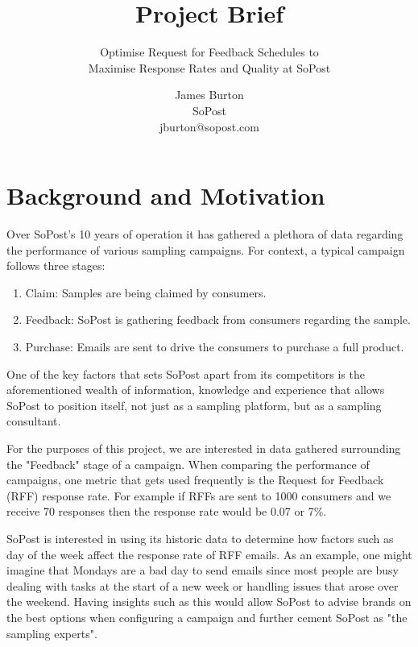 \documentclass[12pt]{scrartcl}
\begin{document}
\title{Project Brief}
\subtitle{Optimise Request for Feedback Schedules to\\
Maximise Response Rates and Quality at SoPost}
\author{James Burton\\SoPost\\jburton@sopost.com}
\maketitle

\section{Background and Motivation}

Over SoPost's 10 years of operation it has gathered a plethora of data regarding
the performance of various sampling campaigns. For context, a typical campaign
follows three stages:

\begin{enumerate}
    \item Claim: Samples are being claimed by consumers.
    \item Feedback: SoPost is gathering feedback from consumers regarding the sample.
    \item Purchase: Emails are sent to drive the consumers to purchase a full product.
\end{enumerate}

One of the key factors that sets SoPost apart from its competitors is the
aforementioned wealth of information, knowledge and experience that allows
SoPost to position itself, not just as a sampling platform, but as a sampling
consultant.

For the purposes of this project, we are interested in data gathered surrounding
the "Feedback" stage of a campaign. When comparing the performance of campaigns,
one metric that gets used frequently is the Request for Feedback (RFF) response rate.
For example if RFFs are sent to 1000 consumers and we receive 70 responses then the
response rate would be 0.07 or 7\%.

SoPost is interested in using its historic data to determine how factors such
as day of the week affect the response rate of RFF emails. As an example, one
might imagine that Mondays are a bad day to send emails since most people are
busy dealing with tasks at the start of a new week or handling issues that arose
over the weekend. Having insights such as this would allow SoPost to advise brands
on the best options when configuring a campaign and further cement SoPost as "the
sampling experts".
\end{document}
